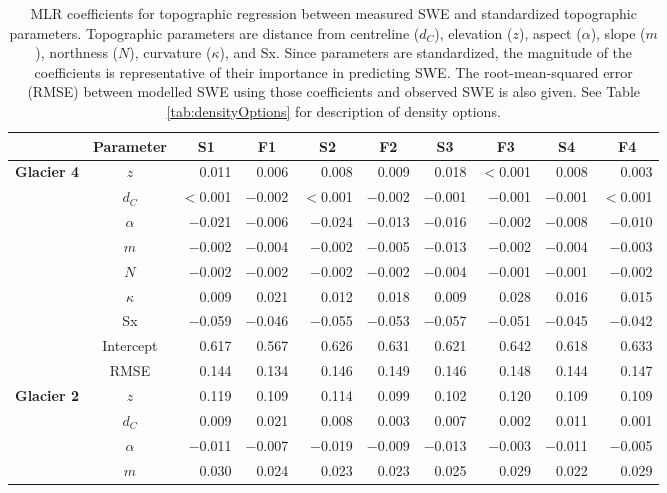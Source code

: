 \documentclass{sfuthesis}
\newcommand{\params}{Topographic parameters are distance from centreline ($d_C$), elevation ($z$), aspect ($\alpha$), slope ($m$), northness ($N$), curvature ($\kappa$), and Sx. }
\begin{document}
\begin{table}
\footnotesize
\centering
\caption{MLR coefficients for topographic regression between measured SWE and standardized topographic parameters. \params  Since parameters are standardized, the magnitude of the coefficients is representative of their importance in predicting SWE. The root-mean-squared error (RMSE) between modelled SWE using those coefficients and observed SWE is also given. See Table \ref{tab:densityOptions} for description of density options.}
\label{tab:MLRcoeffFull}
\begin{tabular}{ccrrrrrrrr}
 & \textbf{Parameter} & \multicolumn{1}{c}{\textbf{S1}} & \multicolumn{1}{c}{\textbf{F1}} & \multicolumn{1}{c}{\textbf{S2}} & \multicolumn{1}{c}{\textbf{F2}} & \multicolumn{1}{c}{\textbf{S3}} & \multicolumn{1}{c}{\textbf{F3}} & \multicolumn{1}{c}{\textbf{S4}} & \multicolumn{1}{c}{\textbf{F4}} \\ \hline \hline
\multirow{9}{*}{\textbf{Glacier 4}} & $z$ & 0.011 & 0.006 & 0.008 & 0.009 & 0.018 & $<$0.001 & 0.008 & 0.003 \\
 & $d_C$ & $<$0.001 & $-$0.002 & $<$0.001 & $-$0.002 & $-$0.001 & $-$0.001 & $-$0.001 & $<$0.001 \\
 & $\alpha$ & $-$0.021 & $-$0.006 & $-$0.024 & $-$0.013 & $-$0.016 & $-$0.002 & $-$0.008 & $-$0.010 \\
 & $m$ & $-$0.002 & $-$0.004 & $-$0.002 & $-$0.005 & $-$0.013 & $-$0.002 & $-$0.004 & $-$0.003 \\
 & $N$ & $-$0.002 & $-$0.002 & $-$0.002 & $-$0.002 & $-$0.004 & $-$0.001 & $-$0.001 & $-$0.002 \\
 & $\kappa$ & 0.009 & 0.021 & 0.012 & 0.018 & 0.009 & 0.028 & 0.016 & 0.015 \\
 & Sx & $-$0.059 & $-$0.046 & $-$0.055 & $-$0.053 & $-$0.057 & $-$0.051 & $-$0.045 & $-$0.042 \\
 & Intercept & 0.617 & 0.567 & 0.626 & 0.631 & 0.621 & 0.642 & 0.618 & 0.633 \\
 & RMSE & 0.144 & 0.134 & 0.146 & 0.149 & 0.146 & 0.148 & 0.144 & 0.147 \\ \hline
\multirow{9}{*}{\textbf{Glacier 2}} & $z$ & 0.119 & 0.109 & 0.114 & 0.099 & 0.102 & 0.120 & 0.109 & 0.109 \\
 & $d_C$ & 0.009 & 0.021 & 0.008 & 0.003 & 0.007 & 0.002 & 0.011 & 0.001 \\
 & $\alpha$ & $-$0.011 & $-$0.007 & $-$0.019 & $-$0.009 & $-$0.013 & $-$0.003 & $-$0.011 & $-$0.005 \\
 & $m$ & 0.030 & 0.024 & 0.023 & 0.023 & 0.025 & 0.029 & 0.022 & 0.029 \\

\end{tabular}
\end{table}
\end{document}
